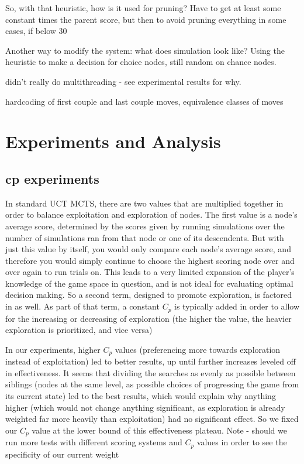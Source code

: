 \documentclass[letterpaper]{article}
\begin{document}
So, with that heuristic, how is it used for pruning? Have to get at least some constant times the parent score, but then to avoid pruning everything in some cases, if below 30%

Another way to modify the system: what does simulation look like? Using the heuristic to make a decision for choice nodes, still random on chance nodes.

didn't really do multithreading - see experimental results for why.

hardcoding of first couple and last couple moves, equivalence classes of moves

\section{Experiments and Analysis}

\subsection{cp experiments}
In standard UCT MCTS, there are two values that are multiplied together in order to balance exploitation and exploration of nodes. The first value is a node’s average score, determined by the scores given by running simulations over the number of simulations ran from that node or one of its descendents. But with just this value by itself, you would only compare each node’s average score, and therefore you would simply continue to choose the highest scoring node over and over again to run trials on. This leads to a very limited expansion of the player’s knowledge of the game space in question, and is not ideal for evaluating optimal decision making. So a second term, designed to promote exploration, is factored in as well. As part of that term, a constant $C_p$ is typically added in order to allow for the increasing or decreasing of exploration (the higher the value, the heavier exploration is prioritized, and vice versa)

In our experiments, higher $C_p$ values (preferencing more towards exploration instead of exploitation) led to better results, up until further increases leveled off in effectiveness. It seems that dividing the searches as evenly as possible between siblings (nodes at the same level, as possible choices of progressing the game from its current state) led to the best results, which would explain why anything higher (which would not change anything significant, as exploration is already weighted far more heavily than exploitation) had no significant effect. So we fixed our $C_p$ value at the lower bound of this effectiveness plateau.
Note - should we run more tests with different scoring systems and $C_p$ values in order to see the specificity of our current weight
\end{document}
